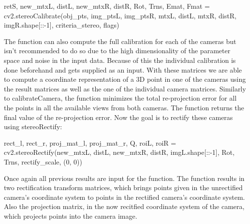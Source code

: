 \documentclass[journal,onecolumn]{IEEEtran}
\begin{document}
\begin{python}
retS, new_mtxL, distL, new_mtxR, distR, Rot, Trns, Emat, Fmat = cv2.stereoCalibrate(obj_pts,
									img_ptsL,
									img_ptsR,
									mtxL,
									distL,
									mtxR,
									distR,
									imgR.shape[::-1],
									criteria_stereo,
									flags)
\end{python}
The function can also compute the full calibration for each of the cameras but isn't recommended to do so due to the high dimensionality of the parameter space and noise in the input data\cite{stereoCalibrate}. Because of this the individual calibration is done beforehand and gets supplied as an input.
With these matrices we are able to compute a coordinate representation of a 3D point in one of the cameras using the result matrices as well as the one of the individual camera matrices.
Similarly to calibrateCamera, the function minimizes the total re-projection error for all the points in all the available views from both cameras. The function returns the final value of the re-projection error.
Now the goal is to rectify these cameras using stereoRectify:
\begin{python}
rect_l, rect_r, proj_mat_l, proj_mat_r, Q, roiL, roiR = cv2.stereoRectify(new_mtxL,
										distL,
										new_mtxR,
										distR,
										imgL.shape[::-1],
										Rot,
										Trns,
										rectify_scale, (0, 0))
\end{python}
Once again all previous results are input for the function. The function results in two rectification transform matrices, which brings points given in the unrectified camera's coordinate system to points in the rectified camera's coordinate system. Also the projection matrix, in the now recitfied coordinate system of the camera, which projects points into the camera image.
\end{document}
